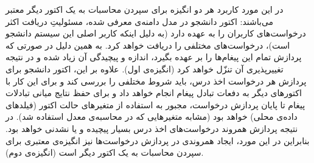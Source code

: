 در این مورد کاربرد هر دو انگیزه برای سپردن محاسبات به یک اکتور دیگر معتبر می‌باشند: اکتور دانشجو در مدل دامنه‌ی معرفی شده، مسئولیتِ دریافت اکثر درخواست‌های کاربران را به عهده دارد (به دلیل اینکه کاربر اصلی این سیستم دانشجو است)، درخواست‌های مختلفی را دریافت خواهد کرد. به همین دلیل در صورتی که  پردازش تمام این پیغام‌ها را بر عهده بگیرد، اندازه و پیچیدگی آن زیاد شده و در نتیجه تغییرپذیری آن تنزّل خواهد کرد (انگیزه‌ی اول). علاوه بر این، اکتور دانشجو برای پردازش هر درخواست اخذ درس، باید شروط مختلفی را بررسی کند و برای این کار با اکتورهای دیگر به دفعات تبادل پیغام انجام خواهد داد و برای حفظ نتایج میانی تبادلات پیغام تا پایان پردازش درخواست، مجبور به استفاده از متغیرهای حالت اکتور (فیلدهای داده‌ی محلی) خواهد بود (مشابه متغیرهایی که در محاسبه‌ی معدل استفاده شد). در نتیجه پردازش همروند درخواست‌های اخذ درس بسیار پیچیده و یا نشدنی خواهد بود. بنابراین در این مورد، ایجاد همروندی در پردازش درخواست‌ها نیز انگیزه‌ی معتبری برای سپردن محاسبات به یک اکتور دیگر است (انگیزه‌ی دوم). \\
